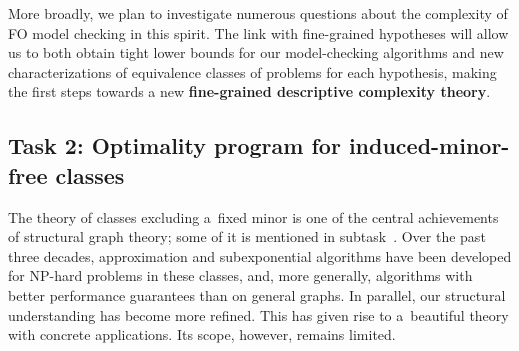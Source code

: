 \documentclass[a4paper,11pt]{article}
\newcommand{\fo}{\textsf{FO}\xspace}
\newcommand{\Oh}{\mathcal{O}}
\newtheorem{conj}{Conjecture}
\newenvironment{conjecture}[1][]
{
  \if\relax\detokenize{#1}\relax\begin{conj}\else\begin{conj}[#1]\fi
  \begin{mdframed}[style=conjecturestyle]
}
{
  \end{mdframed}\end{conj}
}
\begin{document}
%
%

More broadly, we plan to investigate numerous questions about the complexity of
\fo model checking in this spirit.  The link with fine-grained hypotheses will
allow us to both obtain tight lower bounds for our model-checking algorithms
and new characterizations of equivalence classes of problems for each
hypothesis, making the first steps towards a new \textbf{fine-grained
descriptive complexity theory}.

\subsection{Task 2: Optimality program for induced-minor-free classes}\label{task:2}

The theory of classes excluding a~fixed minor is one of the central achievements of structural graph theory; some of it is mentioned in subtask~.
Over the past three decades, approximation and subexponential algorithms have been developed for NP-hard problems in these classes, and, more generally, algorithms with better performance guarantees than on general graphs.
In parallel, our structural understanding has become more refined.
This has given rise to a~beautiful theory with concrete applications.
Its scope, however, remains limited.
\end{document}
